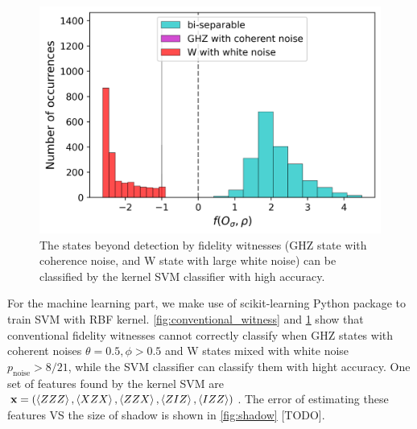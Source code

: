 \documentclass[
aps,
pra,
twocolumn,
floatfix,
]{revtex4-2}
\theoremstyle{plain}
\theoremstyle{definition}
\newcommand{\noise}{\text{noise}}
\begin{document}
\begin{figure}[!ht]
	\centering
		\includegraphics[width=.9\linewidth]{./Code/three_qubit_hist_ML.png}
	\caption{The states beyond detection by fidelity witnesses (GHZ state with coherence noise, and W state with large white noise) can be classified by the kernel SVM classifier with high accuracy.}
	\label{fig:ml_compare}
\end{figure}
For the machine learning part, we make use of scikit-learning Python package \cite{pedregosaScikitlearnMachineLearning2011} to train SVM with RBF kernel.
\cref{fig:conventional_witness} and \cref{fig:ml_compare} show that conventional fidelity witnesses cannot correctly classify when GHZ states with coherent noises $\theta=0.5,\phi>0.5$ and W states mixed with white noise $p_{\noise}>8/21$,
while the SVM classifier can classify them with hight accuracy.
One set of features found by the kernel SVM are $\vb{x}=(\expval{ZZZ},\expval{XZX},\expval{ZZX},\expval{ZIZ},\expval{IZZ})$.
The error of estimating these features VS the size of shadow is shown in \cref{fig:shadow} [TODO].
\end{document}

